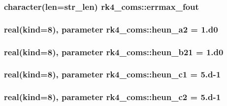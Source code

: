 \subsubsection[{\texorpdfstring{errmax\+\_\+fout}{errmax_fout}}]{\setlength{\rightskip}{0pt plus 5cm}character(len=str\+\_\+len) rk4\+\_\+coms\+::errmax\+\_\+fout}\hypertarget{namespacerk4__coms_af90527ec55879335bb58710234142b14}{}\label{namespacerk4__coms_af90527ec55879335bb58710234142b14}
\subsubsection[{\texorpdfstring{heun\+\_\+a2}{heun_a2}}]{\setlength{\rightskip}{0pt plus 5cm}real(kind=8), parameter rk4\+\_\+coms\+::heun\+\_\+a2 = 1.d0}\hypertarget{namespacerk4__coms_a87d69315c8ce5a8eece7631c044e56e5}{}\label{namespacerk4__coms_a87d69315c8ce5a8eece7631c044e56e5}
\subsubsection[{\texorpdfstring{heun\+\_\+b21}{heun_b21}}]{\setlength{\rightskip}{0pt plus 5cm}real(kind=8), parameter rk4\+\_\+coms\+::heun\+\_\+b21 = 1.d0}\hypertarget{namespacerk4__coms_ae8d76c010784094c3299f39f54d015c1}{}\label{namespacerk4__coms_ae8d76c010784094c3299f39f54d015c1}
\subsubsection[{\texorpdfstring{heun\+\_\+c1}{heun_c1}}]{\setlength{\rightskip}{0pt plus 5cm}real(kind=8), parameter rk4\+\_\+coms\+::heun\+\_\+c1 = 5.d-\/1}\hypertarget{namespacerk4__coms_aacfe35ff98522754e71ad11a44b521b4}{}\label{namespacerk4__coms_aacfe35ff98522754e71ad11a44b521b4}
\subsubsection[{\texorpdfstring{heun\+\_\+c2}{heun_c2}}]{\setlength{\rightskip}{0pt plus 5cm}real(kind=8), parameter rk4\+\_\+coms\+::heun\+\_\+c2 = 5.d-\/1}\hypertarget{namespacerk4__coms_afad602ec1632d28447fa784393dd4777}{}\label{namespacerk4__coms_afad602ec1632d28447fa784393dd4777}
